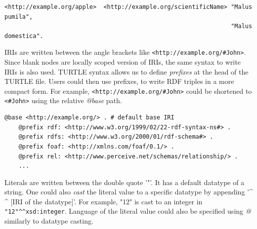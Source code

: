 \begin{lstlisting}[label={lst:different_object}, 
    caption={Usage of ',' where triples differs only in the objects.}]
<http://example.org/apple>  <http://example.org/scientificName> "Malus pumila", 
                                                                "Malus domestica".
\end{lstlisting}


IRIs are written between the angle brackets like \lstinline{<http://example.org/#John>}.
Since blank nodes are locally scoped version of IRIs, the same syntax to write IRIs is also used.
TURTLE syntax allows us to define \textit{prefixes} at the head of the TURTLE file.
Users could then use prefixes, to write RDF triples in a more compact form. For example,
\lstinline{<http://example.org/#John>} could be shortened to
\lstinline{<#John>} using the relative \textit{@base} path.

\begin{lstlisting}[caption=Prefixes in TURTLE syntax.]
    @base <http://example.org/> . # default base IRI
    @prefix rdf: <http://www.w3.org/1999/02/22-rdf-syntax-ns#> .
    @prefix rdfs: <http://www.w3.org/2000/01/rdf-schema#> .
    @prefix foaf: <http://xmlns.com/foaf/0.1/> .
    @prefix rel: <http://www.perceive.net/schemas/relationship/> . 
    ... 
\end{lstlisting}

Literals are written between the double quote '"'. It has a default datatype of 
a string. One could also \textit{cast} the literal value to a specific datatype 
by appending '\textasciicircum{} \textasciicircum{} $[$IRI of the datatype$]$'. For example, 
"12" is cast to an integer in \lstinline{"12"^^xsd:integer}. Language of the literal value 
could also be specified using \textit{@} similarly to datatype casting. 
